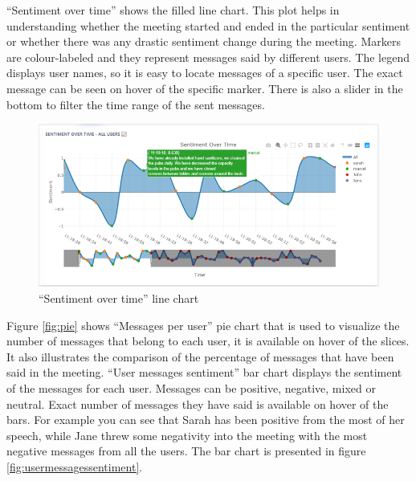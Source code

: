\documentclass{article}
\begin{document}
{\large 
``Sentiment over time'' shows the filled line chart. This plot helps in understanding whether the meeting started and ended in the particular sentiment or whether there was any drastic sentiment change during the meeting. Markers are colour-labeled and they represent messages said by different users. The legend displays user names, so it is easy to locate messages of a specific user. The exact message can be seen on hover of the specific marker. There is also a slider in the bottom to filter the time range of the sent messages.\par
}

\vspace{10pt}
\begin{figure}[H]
  \centering
  \includegraphics[scale=0.72]{charts/sentimentovertime.png}
  \caption{``Sentiment over time'' line chart}
  \label{fig:sentimentovertime}
\end{figure}

{\large 
Figure \ref{fig:pie} shows ``Messages per user'' pie chart that is used to visualize the number of messages that belong to each user, it is available on hover of the slices. It also illustrates the comparison of the percentage of messages that have been said in the meeting. ``User messages sentiment'' bar chart displays the sentiment of the messages for each user. Messages can be positive, negative, mixed or neutral. Exact number of messages they have said is available on hover of the bars. For example you can see that Sarah has been positive from the most of her speech, while Jane threw some negativity into the meeting with the most negative messages from all the users. The bar chart is presented in figure \ref{fig:usermessagessentiment}.\par
}
\end{document}
